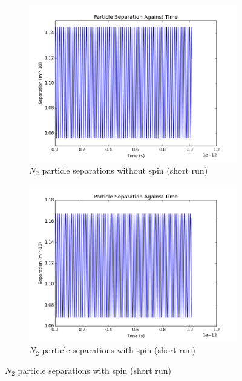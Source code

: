 \documentclass[12pt]{article}
\begin{document}
	
\begin{figure}[H]
		\centering
		\begin{subfigure}{0.45\textwidth}
			\includegraphics[width=\textwidth]{n2nospinsep}
			\caption*{$N_2$ particle separations without spin (short run)}
		\end{subfigure}
		\begin{subfigure}{0.45\textwidth}
			\includegraphics[width=\textwidth]{n2spinsep}
			\caption*{$N_2$ particle separations with spin (short run)}
		\end{subfigure}
	\end{figure}
	
\end{document}
